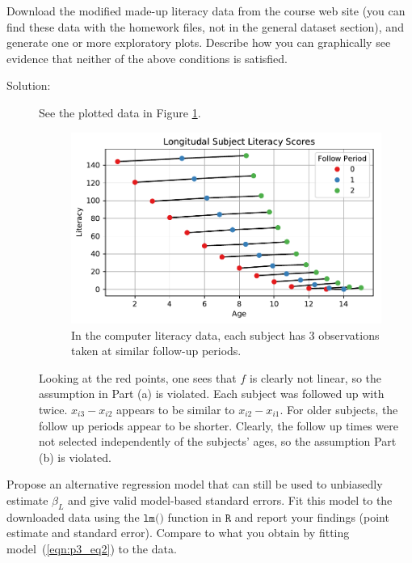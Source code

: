 \documentclass[11pt, letterpaper]{article}
\begin{document}
{\begin{enumerate}[(a)]
{\em \item Download the modified made-up literacy data from the course web site (you can find these data with the homework files, not in the general dataset section), and generate
one or more exploratory plots.  Describe how you can graphically see evidence that neither of
the above conditions is satisfied.}

\begin{description}
\item[Solution:] See the plotted data in Figure \ref{fig:p3_data}.

  \begin{figure}
    \centering
    \includegraphics{p3_data.pdf}
    \caption{In the computer literacy data, each subject has 3 observations
      taken at similar follow-up periods.}
    \label{fig:p3_data}
  \end{figure}
  Looking at the red points, one sees that $f$ is clearly not linear, so the
  assumption in Part (a) is violated. Each subject was followed up with
  twice. $x_{i3} - x_{i2}$ appears to be similar to $x_{i2} - x_{i1}$. For older
  subjects, the follow up periods appear to be shorter. Clearly, the follow up
  times were not selected independently of the subjects' ages, so the assumption
  Part (b) is violated.
\end{description}

{\em \item Propose an alternative regression model that can still be used to unbiasedly estimate $\beta_L$ and give valid model-based standard errors.  Fit this model to the downloaded data using the $\texttt{lm()}$ function in $\texttt{R}$ and report your findings (point estimate and standard error).
  Compare to what you obtain by fitting model~(\ref{eqn:p3_eq2}) to the data.}


\end{enumerate}}
\end{document}
